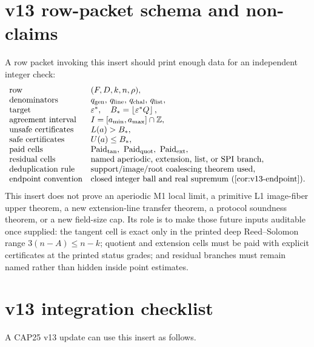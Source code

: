 \section{v13 row-packet schema and non-claims}\label{sec:v13-packet-schema}

A row packet invoking this insert should print enough data for an independent integer check:
\[
\begin{array}{ll}
\text{row} & (F,D,k,n,\rho),\\
\text{denominators} & q_{\mathrm{gen}},\,q_{\mathrm{line}},\,q_{\mathrm{chal}},\,q_{\mathrm{list}},\\
\text{target} & \varepsilon^*,\quad B_*=\floor{\varepsilon^*Q},\\
\text{agreement interval} & I=[a_{\min},a_{\max}]\cap\mathbb Z,\\
\text{unsafe certificates} & L(a)>B_*,\\
\text{safe certificates} & U(a)\le B_*,\\
\text{paid cells} & \Paid_{\tan},\ \Paid_{\mathrm{quot}},\ \Paid_{\mathrm{ext}},\\
\text{residual cells} & \text{named aperiodic, extension, list, or SPI branch},\\
\text{deduplication rule} & \text{support/image/root coalescing theorem used},\\
\text{endpoint convention} & \text{closed integer ball and real supremum \textup(\cref{cor:v13-endpoint}\textup)}.
\end{array}
\]
This insert does not prove an aperiodic M1 local limit, a primitive L1 image-fiber upper theorem, a new extension-line transfer theorem, a protocol soundness theorem, or a new field-size cap.  Its role is to make those future inputs auditable once supplied: the tangent cell is exact only in the printed deep Reed--Solomon range $3(n-A)\le n-k$; quotient and extension cells must be paid with explicit certificates at the printed status grades; and residual branches must remain named rather than hidden inside point estimates.

\section{v13 integration checklist}\label{sec:v13-checklist}

A CAP25 v13 update can use this insert as follows.

